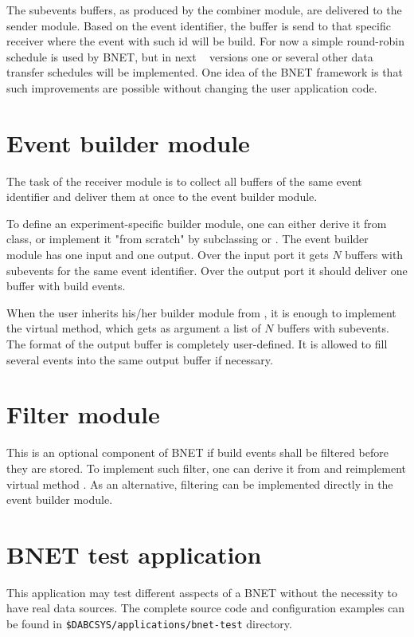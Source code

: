 The subevents buffers, as produced by the combiner module, are delivered 
to the sender module. Based on the event identifier, the buffer is 
send to that specific receiver where the event with such id will be build. 
For now a simple round-robin schedule is used by BNET, but in next 
\dabc~ versions one or several other data transfer schedules will be implemented.
One idea of the BNET framework is that such improvements are possible without
changing the user application code.  


\section{Event builder module}

The task of the receiver module is to collect all buffers of the 
same event identifier and
deliver them at once to the event builder module.

To define an experiment-specific builder module, one can either derive it from
 class, or implement it "from scratch"
 by subclassing  or . 
The event builder module has one input and one output. Over the input port 
it gets
$N$ buffers with subevents for the same event identifier. 
Over the output port it should deliver one
buffer with build events. 
 
When the user inherits his/her builder module from ,
it is enough to implement the virtual  method, 
which gets as argument a list of $N$ buffers with subevents. 
The format of the output buffer is completely user-defined. 
It is allowed to fill several events into the same output buffer if necessary.    


\section{Filter module}

This is an optional component of BNET if build events shall be filtered
before they are stored. To implement such filter, 
one can derive it from  and reimplement virtual method
. As an alternative, filtering can be implemented directly in the 
event builder module.  


\section{BNET test application}
\label{prog_exabnet_test}
This application may test different asspects of a BNET
without the necessity to have real data sources. The complete source code 
and configuration
examples can be found in {\tt \$DABCSYS/applications/bnet-test} directory.  

